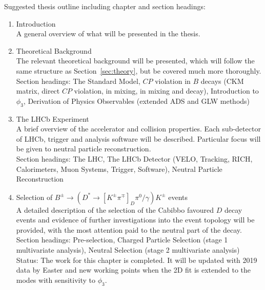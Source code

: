 \documentclass[oneside,12pt]{article}
\begin{document}
\noindent Suggested thesis outline including chapter and section headings:
\begin{enumerate}
  \item Introduction \\

    A general overview of what will be presented in the thesis. \\

  \item Theoretical Background \\

    The relevant theoretical background will be presented, which will follow the
    same structure as Section~\ref{sec:theory}, but be covered much more
    thoroughly. \\ 

    Section headings: The Standard Model, $CP$ violation in $B$ decays
    (CKM matrix, direct $CP$ violation, in mixing, in mixing and decay),
    Introduction to $\phi_3$, Derivation of Physics Observables (extended ADS and
    GLW methods)

  \item The LHCb Experiment \\

    A brief overview of the accelerator and collision properties. Each sub-detector
    of LHCb, trigger and analysis software will be described.  Particular focus
    will be given to neutral particle reconstruction. \\

    Section headings: The LHC, The LHCb Detector (VELO, Tracking, RICH,
    Calorimeters, Muon Systems, Trigger, Software), Neutral Particle Reconstruction 

  \item Selection of $B^{\pm}\rightarrow (D^*\rightarrow
    [K^{\pm}\pi^{\mp}]_D\pi^0/\gamma)K^{\pm}$ events \\

    A detailed description of the selection of the Cabibbo favoured $D$ decay
    events and evidence of further investigations into the event topology will be
    provided, with the most attention paid to the neutral part of the decay. \\

    Section headings: Pre-selection, Charged Particle Selection (stage 1
    multivariate analysis), Neutral Selection (stage 2 multivariate analysis) \\

    Status: The work for this chapter is completed. It will be updated with 2019
    data by Easter and new working points when the 2D fit is extended to the modes with
    sensitivity to $\phi_3$.


\end{enumerate}
\end{document}
